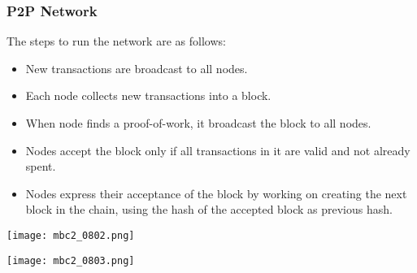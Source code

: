 \begin{frame}
    \frametitle{P2P Network}
    The steps to run the network are as follows:
    \begin{itemize}
        \item New transactions are broadcast to all nodes.
        \item Each node collects new transactions into a block.
        \item When node finds a proof-of-work, it broadcast the block to all nodes.
        \item Nodes accept the block only if all transactions in it are valid and not already spent.
        \item Nodes express their acceptance of the block by working on creating the next block in the chain, using the hash of the accepted block as previous hash.
    \end{itemize}
\end{frame}

\begin{frame}
    \texttt{[image: mbc2\_0802.png]}
\end{frame}

\begin{frame}
    \texttt{[image: mbc2\_0803.png]}
\end{frame}
